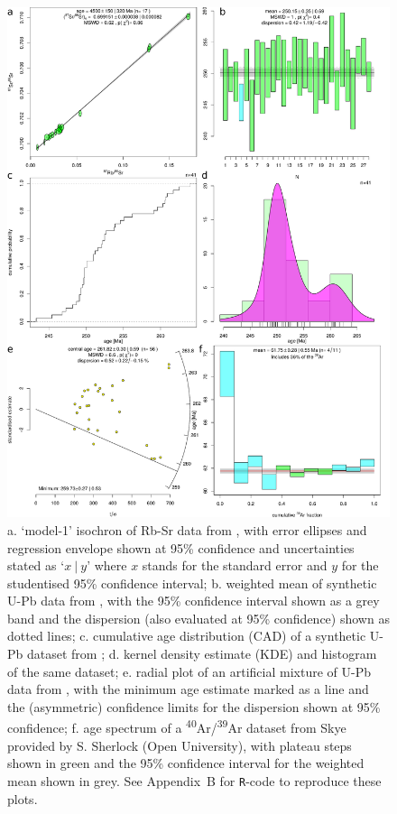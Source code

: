 \documentclass{article}
\begin{document}
\begin{figure}[p]
  \centering
  \includegraphics[width=.8\textwidth]{fig1.pdf}
  \caption{ a. `model-1' isochron of Rb-Sr data from
    \citet{compston1971}, with error ellipses and regression envelope
    shown at 95\% confidence and uncertainties stated as `$x~|~y$'
    where $x$ stands for the standard error and $y$ for the
    studentised 95\% confidence interval; b. weighted mean of
    synthetic U-Pb data from \citet{ludwig2003}, with the 95\%
    confidence interval shown as a grey band and the dispersion (also
    evaluated at 95\% confidence) shown as dotted lines; c. cumulative
    age distribution (CAD) of a synthetic U-Pb dataset from
    \citet{ludwig2003}; d. kernel density estimate (KDE) and histogram
    of the same dataset; e. radial plot of an artificial mixture of
    U-Pb data from \citet{ludwig2003}, with the minimum age estimate
    marked as a line and the (asymmetric) confidence limits for the
    dispersion shown at 95\% confidence; f. age spectrum of a
    \textsuperscript{40}Ar/\textsuperscript{39}Ar dataset from Skye
    provided by S. Sherlock (Open University), with plateau steps
    shown in green and the 95\% confidence interval for the weighted
    mean shown in grey. See Appendix~B for \texttt{R}-code to
    reproduce these plots.}
  \label{fig:1}
\end{figure}
\end{document}
